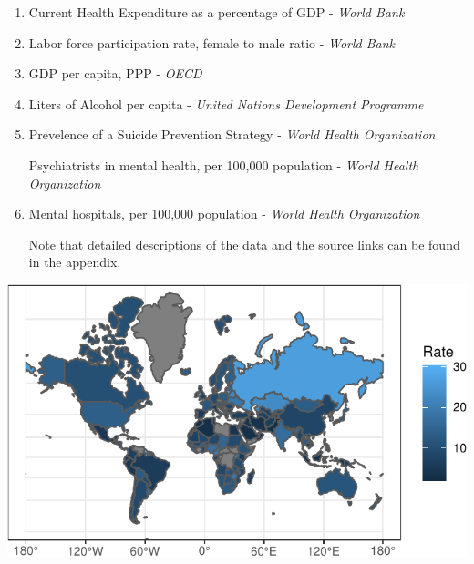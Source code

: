 \documentclass[]{article}
\begin{document}
\begin{enumerate}
\def\labelenumi{\arabic{enumi}.}
\item
  Current Health Expenditure as a percentage of GDP - 
  \emph{World Bank}

\item
  Labor force participation rate, female to male ratio - 
  \emph{World Bank}
  
\item
  GDP per capita, PPP - 
  \emph{OECD} 
\item
  Liters of Alcohol per capita - 
 \emph{United
  Nations Development Programme}
  
\item
  Prevelence of a Suicide Prevention Strategy - 
  \emph{World Health Organization}
  
  Psychiatrists in mental health, per 100,000 population - 
  \emph{World Health Organization}
  
\item
  Mental hospitals, per 100,000 population - 
  \emph{World Health Organization}
    
Note that detailed descriptions of the data and the source links can be found in the appendix. 


 
\end{enumerate}

\begin{center}\includegraphics{Project_Report_files/figure-latex/world_map_plot-1} \end{center}
\end{document}
